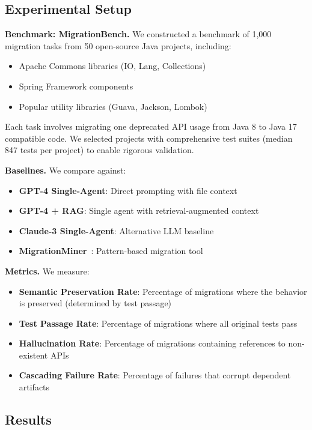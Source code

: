 \documentclass[sigconf,review,anonymous]{acmart}
\begin{document}
\subsection{Experimental Setup}

\textbf{Benchmark: MigrationBench.} We constructed a benchmark of 1,000 migration tasks from 50 open-source Java projects, including:
\begin{itemize}
    \item Apache Commons libraries (IO, Lang, Collections)
    \item Spring Framework components
    \item Popular utility libraries (Guava, Jackson, Lombok)
\end{itemize}

Each task involves migrating one deprecated API usage from Java 8 to Java 17 compatible code. We selected projects with comprehensive test suites (median 847 tests per project) to enable rigorous validation.

\textbf{Baselines.} We compare against:
\begin{itemize}
    \item \textbf{GPT-4 Single-Agent}: Direct prompting with file context
    \item \textbf{GPT-4 + RAG}: Single agent with retrieval-augmented context
    \item \textbf{Claude-3 Single-Agent}: Alternative LLM baseline
    \item \textbf{MigrationMiner}~\cite{alrubaye2019migrationminer}: Pattern-based migration tool
\end{itemize}

\textbf{Metrics.} We measure:
\begin{itemize}
    \item \textbf{Semantic Preservation Rate}: Percentage of migrations where the behavior is preserved (determined by test passage)
    \item \textbf{Test Passage Rate}: Percentage of migrations where all original tests pass
    \item \textbf{Hallucination Rate}: Percentage of migrations containing references to non-existent APIs
    \item \textbf{Cascading Failure Rate}: Percentage of failures that corrupt dependent artifacts
\end{itemize}

\subsection{Results}
\end{document}

